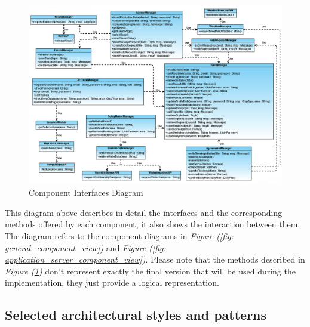 \documentclass[table, 12pt]{article}
\begin{document}
\begin{center}
    \begin{figure}[H]
        \includegraphics[scale=0.55, center]{assets/component-interfaces.png}
        \caption{Component Interfaces Diagram}
        \label{fig: component_interfaces}
    \end{figure}
\end{center}

This diagram above describes in detail the interfaces and the corresponding methods offered by each component, it also shows the interaction between them.
The diagram refers to the component diagrams in \textit{Figure (\ref{fig: general_component_view})} and \textit{Figure (\ref{fig: application_server_component_view})}.
Please note that the methods described in \textit{Figure (\ref{fig: component_interfaces})} don't represent exactly the final version that will be used during the implementation, they just provide a logical representation.

\subsection{Selected architectural styles and patterns}
\end{document}
